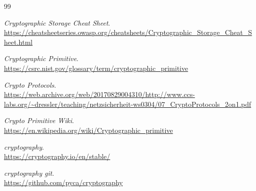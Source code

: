 \documentclass[12pt,a4paper]{article}
\begin{document}
\begin{thebibliography}{99} 

    \textit{Cryptographic Storage Cheat Sheet}.
    \\
    \url{https://cheatsheetseries.owasp.org/cheatsheets/Cryptographic_Storage_Cheat_Sheet.html}


    \textit{Cryptographic Primitive}.
    \\
    \url{https://csrc.nist.gov/glossary/term/cryptographic_primitive}


    \textit{Crypto Protocols}.
    \\
    \url{https://web.archive.org/web/20170829004310/http://www.ccs-labs.org/~dressler/teaching/netzsicherheit-ws0304/07_CryptoProtocols_2on1.pdf}

    \textit{Crypto Primitive Wiki}.
    \\
    \url{https://en.wikipedia.org/wiki/Cryptographic_primitive}

    \textit{cryptography}.
    \\
    \url{https://cryptography.io/en/stable/}
 
    \textit{cryptography git}.
    \\
    \url{https://github.com/pyca/cryptography}   

\end{thebibliography}
\end{document}
